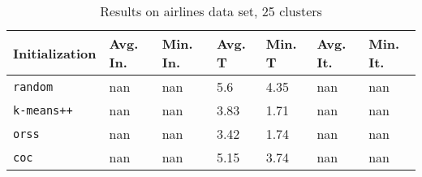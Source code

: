 \begin{table}[h]
	\begin{center}
		\begin{tabular}{|l|l|l|l|l|l|l|}
			\hline
			Initialization & Avg. In. & Min. In. & Avg. T & Min. T & Avg. It. & Min. It.\\\hline
			\texttt{random} & nan & nan & 5.6 & 4.35 & nan & nan\\\hline
			\texttt{k-means++} & nan & nan & 3.83 & 1.71 & nan & nan\\\hline
			\texttt{orss} & nan & nan & 3.42 & 1.74 & nan & nan\\\hline
			\texttt{coc} & nan & nan & 5.15 & 3.74 & nan & nan\\\hline
		\end{tabular}
		\caption{Results on airlines data set, 25 clusters}
		\label{tbl:airlines25}
	\end{center}
\end{table}

